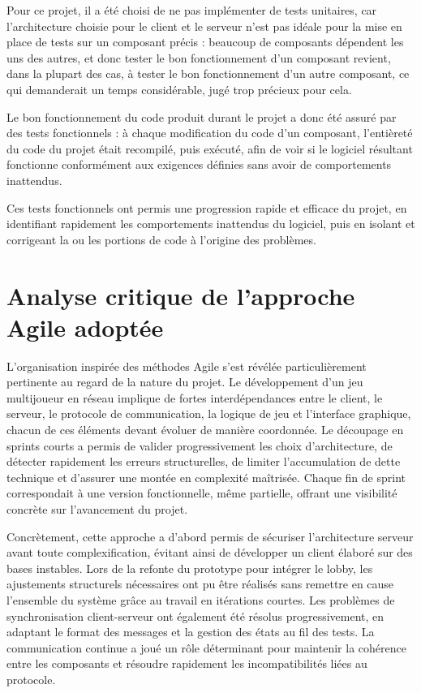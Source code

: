 \documentclass[a4paper, 11pt]{article}
\begin{document}
Pour ce projet, il a été choisi de ne pas implémenter de tests unitaires, car l'architecture choisie pour le client et le serveur n'est pas idéale pour la mise en place de tests sur un composant précis : beaucoup de composants dépendent les uns des autres, et donc tester le bon fonctionnement d'un composant revient, dans la plupart des cas, à tester le bon fonctionnement d'un autre composant, ce qui demanderait un temps considérable, jugé trop précieux pour cela.

Le bon fonctionnement du code produit durant le projet a donc été assuré par des tests fonctionnels : à chaque modification du code d'un composant, l'entièreté du code du projet était recompilé, puis exécuté, afin de voir si le logiciel résultant fonctionne conformément aux exigences définies sans avoir de comportements inattendus.

Ces tests fonctionnels ont permis une progression rapide et efficace du projet, en identifiant rapidement les comportements inattendus du logiciel, puis en isolant et corrigeant la ou les portions de code à l'origine des problèmes.


\section{Analyse critique de l’approche Agile adoptée}

L’organisation inspirée des méthodes Agile s’est révélée particulièrement pertinente au regard de la nature du projet. Le développement d’un jeu multijoueur en réseau implique de fortes interdépendances entre le client, le serveur, le protocole de communication, la logique de jeu et l’interface graphique, chacun de ces éléments devant évoluer de manière coordonnée. Le découpage en sprints courts a permis de valider progressivement les choix d’architecture, de détecter rapidement les erreurs structurelles, de limiter l’accumulation de dette technique et d’assurer une montée en complexité maîtrisée. Chaque fin de sprint correspondait à une version fonctionnelle, même partielle, offrant une visibilité concrète sur l’avancement du projet.

Concrètement, cette approche a d’abord permis de sécuriser l’architecture serveur avant toute complexification, évitant ainsi de développer un client élaboré sur des bases instables. Lors de la refonte du prototype pour intégrer le lobby, les ajustements structurels nécessaires ont pu être réalisés sans remettre en cause l’ensemble du système grâce au travail en itérations courtes. Les problèmes de synchronisation client-serveur ont également été résolus progressivement, en adaptant le format des messages et la gestion des états au fil des tests. La communication continue a joué un rôle déterminant pour maintenir la cohérence entre les composants et résoudre rapidement les incompatibilités liées au protocole.
\end{document}
